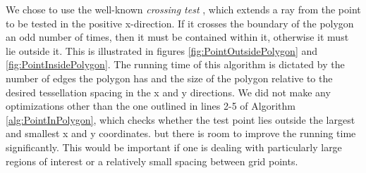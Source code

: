 
We chose to use the well-known \textit{crossing test} \cite{Shimrat1962Algorithms}, which extends a ray from the point to be tested in the positive x-direction. If it crosses the boundary of the polygon an odd number of times, then it must be contained within it, otherwise it must lie outside it. This is illustrated in figures \ref{fig:PointOutsidePolygon} and \ref{fig:PointInsidePolygon}. The running time of this algorithm is dictated by the number of edges the polygon has and the size of the polygon relative to the desired tessellation spacing in the x and y directions. We did not make any optimizations other than the one outlined in lines 2-5 of Algorithm \ref{alg:PointInPolygon}, which checks whether the test point lies outside the largest and smallest x and y coordinates. but there is room to improve the running time significantly. This would be important if one is dealing with particularly large regions of interest or a relatively small spacing between grid points.


\begin{figure}{}
\hspace{1em}
\end{figure}



